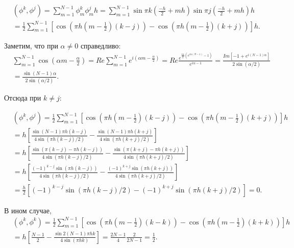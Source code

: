\documentclass[14pt,a4paper]{extarticle}
\newcommand{\1}{\mathbbm{1}}
\begin{document}
\begin{align*}
    & (\phi^k, \phi^j) = \sum_{m = 1}^{N - 1} \phi_m^k \phi_m^j h 
    = \sum_{m = 1}^{N - 1} \sin{\pi k (\frac{-h}{2} + m h)} \sin{\pi j (\frac{-h}{2} + m h)} h \\ 
    & = \frac{1}{2} \sum_{m = 1}^{N - 1} [ \cos{(\pi h (m - \frac{1}{2})(k - j))} - \cos{(\pi h (m - \frac{1}{2})(k + j))} ] h.
\end{align*}

Заметим, что при $\alpha \neq 0$ справедливо:
\begin{align*}
    & \sum_{m = 1}^{N - 1} \cos(\alpha m - \frac{\alpha}{2}) = Re\sum_{m = 1}^{N - 1} e^{i (\alpha m - \frac{\alpha}{2})} 
     = Re \frac{e^{\frac{i \alpha}{2}(e^{i \alpha (N - 1)} - 1)}}{e^{i \alpha - 1}} 
     = \frac{Im [-1 + e^{i (N - 1) \alpha}]}{2 \sin(\alpha/2)} \\
    & = \frac{\sin{(N - 1) \alpha}}{2 \sin(\alpha/2)}.
\end{align*}

Отсюда при $k \neq j$:

\begin{align*}
    & (\phi^k, \phi^j) 
    = \frac{1}{2} \sum_{m = 1}^{N - 1} [ \cos{(\pi h (m - \frac{1}{2})(k - j))} - \cos{(\pi h (m - \frac{1}{2})(k + j))} ] h \\
    & = h \left[ \frac{\sin{(N - 1) \pi h (k - j)}}{4 \sin(\pi h (k - j)/2)} - \frac{\sin{(N - 1) \pi h (k + j)}}{4 \sin(\pi h (k + j)/2)} \right] \\
    & = h \left[ \frac{\sin(\pi (k - j) - \pi h (k - j))}{4 \sin(\pi h (k - j)/2)}
        - \frac{\sin(\pi (k + j) - \pi h (k + j))}{4 \sin(\pi h (k + j)/2)}\right] \\
    & = h \left[ \frac{(-1)^{k-j}\sin(\pi h (k - j))}{4 \sin(\pi h (k - j)/2)}
    - \frac{(-1)^{k+j}\sin(\pi h (k + j))}{4 \sin(\pi h (k + j)/2)}\right] \\
    & = \frac{h}{2} [(-1)^{k-j}\sin(\pi h (k - j)/2) - (-1)^{k+j}\sin(\pi h (k + j)/2)] = 0.
\end{align*}

В ином случае, 
\begin{align*}
    & (\phi^k, \phi^k) 
    = \frac{1}{2} \sum_{m = 1}^{N - 1} [ \cos{(\pi h (m - \frac{1}{2})(k - k))} - \cos{(\pi h (m - \frac{1}{2})(k + k))} ] h \\
    & = h \left[ \frac{N - 1}{2} - \frac{\sin{2 (N - 1) \pi h k}}{4 \sin(\pi h k)} \right] 
    = \frac{2 N - 1}{4} \frac{2}{2 N - 1} = \frac{1}{2}.
\end{align*}
\end{document}
